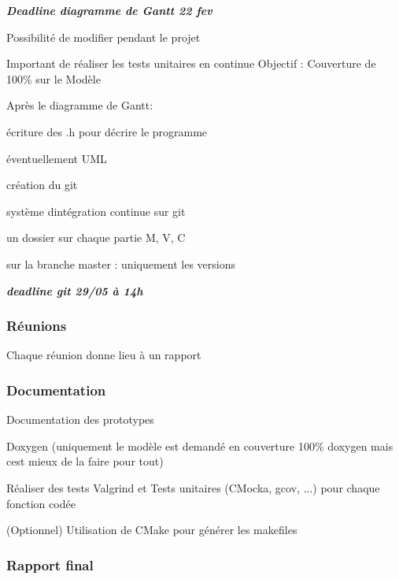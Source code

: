 {\itshape {\bfseries Deadline diagramme de Gantt 22 fev}}
\begin{DoxyItemize}
\item Possibilité de modifier pendant le projet
\end{DoxyItemize}

Important de réaliser les tests unitaires en continue Objectif \+: Couverture de 100\% sur le Modèle

Après le diagramme de Gantt\+:
\begin{DoxyItemize}
\item écriture des .h pour décrire le programme
\item éventuellement U\+ML
\item création du git
\item système d\textquotesingle{}intégration continue sur git
\item un dossier sur chaque partie M, V, C
\item sur la branche master \+: uniquement les versions
\end{DoxyItemize}

{\itshape {\bfseries deadline git 29/05 à 14h}}

\subsubsection*{Réunions}


\begin{DoxyItemize}
\item Chaque réunion donne lieu à un rapport
\end{DoxyItemize}

\subsubsection*{Documentation}


\begin{DoxyItemize}
\item Documentation des prototypes
\item Doxygen (uniquement le modèle est demandé en couverture 100\% doxygen mais c\textquotesingle{}est mieux de la faire pour tout)
\item Réaliser des tests Valgrind et Tests unitaires (C\+Mocka, gcov, ...) pour chaque fonction codée
\item (Optionnel) Utilisation de C\+Make pour générer les makefiles
\end{DoxyItemize}

\subsubsection*{Rapport final}


